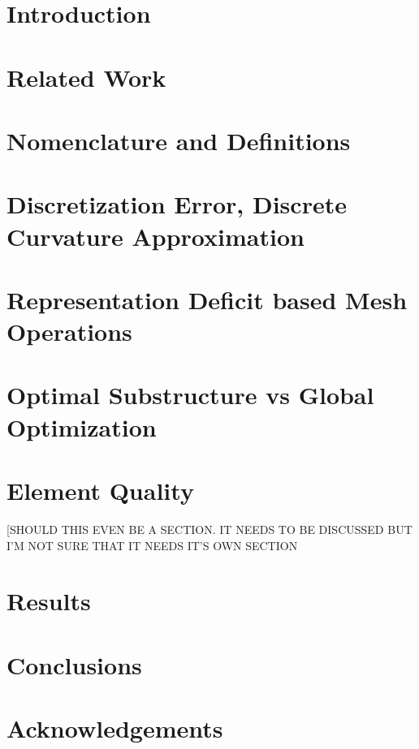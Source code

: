 \documentclass[11pt]{article}
\begin{document}
\section{Introduction}


\section{Related Work}


\section{Nomenclature and Definitions}


\section{Discretization Error, Discrete Curvature Approximation}


\section{Representation Deficit based Mesh Operations}


\section{Optimal Substructure vs Global Optimization}


\section{Element Quality}
[SHOULD THIS EVEN BE A SECTION. IT NEEDS TO BE DISCUSSED BUT I'M NOT
SURE THAT IT NEEDS IT'S OWN SECTION

\section{Results}

\section{Conclusions}

\section{Acknowledgements}



\end{document}
